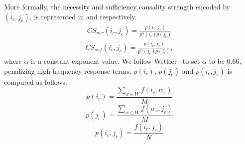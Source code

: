 More formally, the necessity and sufficiency causality strength encoded by $(i_c,j_e)$,
is represented in  and  respectively.
\begin{align}
CS_{nec}(i_c,j_e) = \frac{p(i_c,j_e)}{p^{\alpha}(i_c)p(j_e)}
\label{eq:csnec}
\end{align}
\begin{align}
CS_{suf}(i_c,j_e) = \frac{p(i_c,j_e)}{p^{\alpha}(j_e)p(i_c)}
,\label{eq:cssuf}
\end{align}
where $\alpha$ is a constant exponent value.
We follow Wettler~ to set $\alpha$ to be $0.66$, penalizing
high-frequency response terms.
$p(i_c)$, $p(j_e)$ and $p(i_c,j_e)$ is computed as follows:
\begin{equation}
p(i_c) = \frac{\sum_{w\in W}
f (i_c,w_e)}{M}
\end{equation}
\begin{equation}
p(j_e) = \frac{\sum_{w\in W}
f (w_c,j_e)}{M}
\end{equation}
\begin{equation}
p(i_c,j_e) = \frac{f(i_c,j_e)}{N}
\end{equation}
